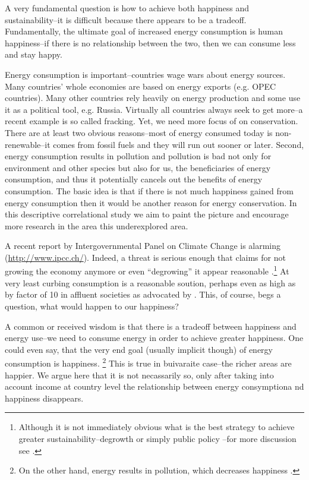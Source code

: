\documentclass[10pt, letterpaper]{article}
\begin{document}
\begin{spacing}{1.4}

 

A very fundamental question is how to achieve both happiness and
sustainability--it is difficult because there appears to be a tradeoff.
Fundamentally,
 the ultimate goal of increased energy consumption is human
 happiness--if there is no relationship between the two, then we can
 consume less and stay happy.

Energy consumption is important--countries wage wars about energy sources. Many
countries' whole economies are based on energy exports (e.g. OPEC
countries). Many other countries rely heavily on energy production and some use
it as a political tool, e.g. Russia. 
Virtually all countries  always seek to get more--a recent example is so called
fracking. Yet, we need more focus of on conservation. There are at least two
obvious reasons--most of energy consumed today is non-renewable--it comes from
fossil fuels and they will run out sooner or later. %
Second, energy consumption results in pollution and pollution is bad not only
for environment and other species but also for us, the beneficiaries of energy
consumption, and thus it potentially cancels out the benefits of energy
consumption. The basic idea is that if there is not much happiness gained from
energy consumption then it would be another reason for energy
conservation. 
In this descriptive correlational study we aim to paint the picture and
encourage more research in the area this underexplored area.

A recent report by
Intergovernmental Panel on Climate Change is alarming 
(\url{http://www.ipcc.ch/}). %
Indeed, a threat is serious enough that
claims for not growing the economy anymore or even ``degrowing'' it
appear reasonable \citep{kallis12}.\footnote{Although it is not
  immediately obvious what is the best strategy to achieve greater
  sustainability--degrowth \citep{kallis11} or simply public policy
  \citep{bergh11}--for more discussion see \citet{daly13,kallis12}.} At very
least curbing consumption is a reasonable soution, perhaps even as high as by
factor of 10 in affluent societies  as advocated by \citet{pretty13}. This,
of course, begs a question, what would happen to our happiness?

A common or received wisdom is that there is a tradeoff between happiness and
energy use--we need to consume energy in order to achieve greater
happiness. One could even say, that the very end goal (usually implicit though)
of energy consumption is happiness. \footnote{On the other hand, energy results in pollution, which
  decreases happiness \citep[e.g]{welsch05, weinhold12}.} This is
true in buivaraite case--the richer areas are happier.
 We argue here that it is not necassarily so, only after taking into account
 income at country level %
 the relationship between energy consymptiona nd happiness disappears.


\end{spacing}
\end{document}
